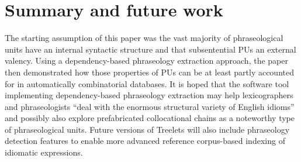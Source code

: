 \documentclass[output=paper]{langscibook}
\begin{document}
\section{Summary and future work}

The starting assumption of this paper was the vast majority of phraseological units have an internal syntactic structure and that subsentential PUs an external valency. Using a dependency-based phraseology extraction approach, the paper then demonstrated how those properties of PUs can be at least partly accounted for in automatically combinatorial databases. It is hoped that the software tool implementing dependency-based phraseology extraction may help lexicographers and phraseologists “deal with the enormous structural variety of English idioms” \citep[11]{CowieEtAl1993} and possibly also explore prefabricated collocational chains as a noteworthy type of phraseological units. Future versions of Treelets will also include phraseology detection features \citep{Pęzik2018} to enable more advanced reference corpus-based indexing of idiomatic expressions.

{\sloppy\printbibliography[heading=subbibliography,notkeyword=this]}
\end{document}
